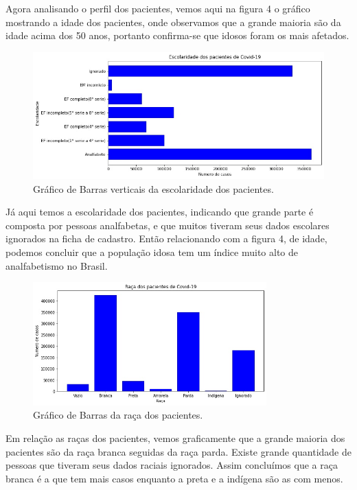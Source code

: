 \documentclass[tcc1]{uftex}
\begin{document}
\begin{itemize}
    Agora analisando o perfil dos pacientes, vemos aqui na figura 4 o gráfico mostrando a idade dos pacientes, onde observamos que a grande maioria são da idade acima dos 50 anos, portanto confirma-se que idosos foram os mais afetados.
    
    \begin{figure}[h]
    \centering
    \includegraphics[width=12cm]{Escolaridade.jpg} %
    \caption{Gráfico de Barras verticais da escolaridade dos pacientes.}
    \end{figure}
    
    Já aqui temos a escolaridade dos pacientes, indicando que grande parte é composta por pessoas analfabetas, e que muitos tiveram seus dados escolares ignorados na ficha de cadastro. Então relacionando com a figura 4, de idade, podemos concluir que a população idosa tem um índice muito alto de analfabetismo no Brasil.

    \begin{figure}[h]
    \centering
    \includegraphics[width=9cm]{Raca.jpg} %
    \caption{Gráfico de Barras da raça dos pacientes.}
    \end{figure}
   
   Em relação as raças dos pacientes, vemos graficamente que a grande maioria dos pacientes são da raça branca seguidas da raça parda. Existe grande quantidade de pessoas que tiveram seus dados raciais ignorados. Assim concluímos que a raça branca é a que tem mais casos enquanto a preta e a indígena são as com menos.
   

\end{itemize}
\end{document}
